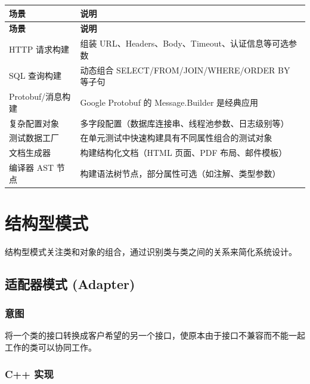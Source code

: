 \documentclass[12pt,a4paper,fontset=fandol]{ctexbook}
\begin{document}
\begin{longtable}{>{\raggedright\arraybackslash}p{4.5cm} >{\raggedright\arraybackslash}p{8.5cm}}
\toprule
\textbf{场景} & \textbf{说明} \\
\midrule
\endfirsthead
\toprule
\textbf{场景} & \textbf{说明} \\
\midrule
\endhead
\bottomrule
\endfoot
HTTP 请求构建 & 组装 URL、Headers、Body、Timeout、认证信息等可选参数 \\
SQL 查询构建 & 动态组合 SELECT/\allowbreak{}\allowbreak{}FROM/\allowbreak{}\allowbreak{}JOIN/\allowbreak{}\allowbreak{}WHERE/\allowbreak{}\allowbreak{}ORDER BY 等子句 \\
Protobuf/消息构建 & Google Protobuf 的 Message.\allowbreak{}Builder 是经典应用 \\
复杂配置对象 & 多字段配置（数据库连接串、线程池参数、日志级别等） \\
测试数据工厂 & 在单元测试中快速构建具有不同属性组合的测试对象 \\
文档生成器 & 构建结构化文档（HTML 页面、PDF 布局、邮件模板） \\
编译器 AST 节点 & 构建语法树节点，部分属性可选（如注解、类型参数） \\
\end{longtable}

\part{结构型模式}

结构型模式关注类和对象的组合，通过识别类与类之间的关系来简化系统设计。

\chapter{适配器模式 (Adapter)}

\section{意图}

将一个类的接口转换成客户希望的另一个接口，使原本由于接口不兼容而不能一起工作的类可以协同工作。

\section{C++ 实现}
\end{document}

